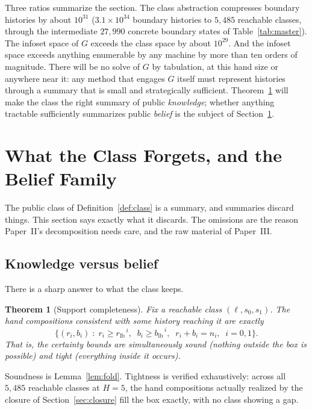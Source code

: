 \documentclass[11pt]{article}
\theoremstyle{plain}
\newtheorem{theorem}{Theorem}[section]
\theoremstyle{definition}
\theoremstyle{remark}
\newcommand{\rlb}{\ensuremath{r_{\mathrm{lb}}}}
\newcommand{\blb}{\ensuremath{b_{\mathrm{lb}}}}
\begin{document}
Three ratios summarize the section. The class abstraction compresses
boundary histories by about $10^{31}$ ($3.1\times10^{34}$ boundary
histories to $5{,}485$ reachable classes, through the intermediate
$27{,}990$ concrete boundary states of Table~\ref{tab:master}). The
infoset space of $G$ exceeds the class space by about $10^{29}$. And the
infoset space exceeds anything enumerable by any machine by more than ten
orders of magnitude. There will be no solve of $G$ by tabulation, at this
hand size or anywhere near it: any method that engages $G$ itself must
represent histories through a summary that is small and strategically
sufficient. Theorem~\ref{thm:support} will make the class the right
summary of public \emph{knowledge}; whether anything tractable
sufficiently summarizes public \emph{belief} is the subject of
Section~\ref{sec:forgets}.

\section{What the Class Forgets, and the Belief Family}\label{sec:forgets}

The public class of Definition~\ref{def:class} is a summary, and summaries
discard things. This section says exactly what it discards. The omissions
are the reason Paper~II's decomposition needs care, and the raw material
of Paper~III.

\subsection{Knowledge versus belief}

There is a sharp answer to what the class keeps.

\begin{theorem}[Support completeness]\label{thm:support}
Fix a reachable class $(\ell,s_0,s_1)$. The hand compositions consistent
with \emph{some} history reaching it are exactly
\[
  \bigl\{(r_i,b_i)\;:\;r_i\ge \rlb^{\,i},\;\; b_i\ge \blb^{\,i},\;\;
                        r_i+b_i=n_i,\;\; i=0,1\bigr\}.
\]
That is, the certainty bounds are simultaneously \emph{sound} (nothing
outside the box is possible) and \emph{tight} (everything inside it occurs).
\end{theorem}

\noindent Soundness is Lemma~\ref{lem:fold}. Tightness is verified
exhaustively: across all $5{,}485$ reachable classes at $H=5$, the hand
compositions actually realized by the closure of Section~\ref{sec:closure}
fill the box exactly, with no class showing a gap.
\end{document}
